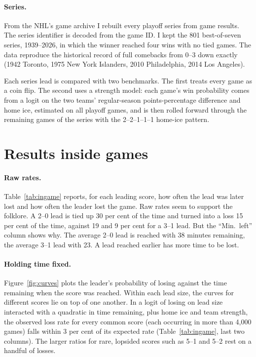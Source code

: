 \documentclass[11pt]{article}
\begin{document}
\paragraph{Series.} From the NHL's game archive I rebuilt every playoff series from game results. The series identifier is decoded from the game ID. I kept the 801 best-of-seven series, 1939--2026, in which the winner reached four wins with no tied games. The data reproduce the historical record of full comebacks from 0--3 down exactly (1942 Toronto, 1975 New York Islanders, 2010 Philadelphia, 2014 Los Angeles).

Each series lead is compared with two benchmarks. The first treats every game as a coin flip. The second uses a strength model: each game's win probability comes from a logit on the two teams' regular-season points-percentage difference and home ice, estimated on all playoff games, and is then rolled forward through the remaining games of the series with the 2--2--1--1--1 home-ice pattern.

\section{Results inside games}

\paragraph{Raw rates.} Table~\ref{tab:ingame} reports, for each leading score, how often the lead was later lost and how often the leader lost the game. Raw rates seem to support the folklore. A 2--0 lead is tied up 30 per cent of the time and turned into a loss 15 per cent of the time, against 19 and 9 per cent for a 3--1 lead. But the ``Min.\ left'' column shows why. The average 2--0 lead is reached with 38 minutes remaining, the average 3--1 lead with 23. A lead reached earlier has more time to be lost.

\paragraph{Holding time fixed.} Figure~\ref{fig:curves} plots the leader's probability of losing against the time remaining when the score was reached. Within each lead size, the curves for different scores lie on top of one another. In a logit of losing on lead size interacted with a quadratic in time remaining, plus home ice and team strength, the observed loss rate for every common score (each occurring in more than 4,000 games) falls within 3 per cent of its expected rate (Table~\ref{tab:ingame}, last two columns). The larger ratios for rare, lopsided scores such as 5--1 and 5--2 rest on a handful of losses.
\end{document}
